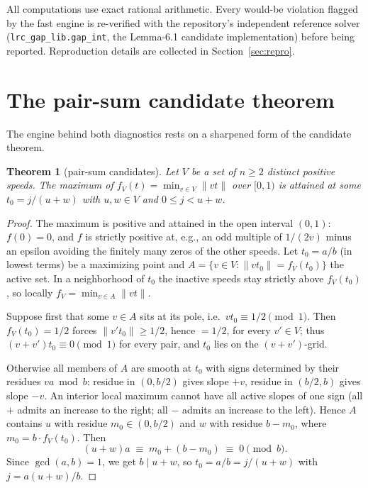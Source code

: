 \documentclass[11pt,a4paper]{article}
\theoremstyle{plain}
\newtheorem{theorem}{Theorem}[section]
\theoremstyle{definition}
\theoremstyle{remark}
\newcommand{\norm}[1]{\lVert #1 \rVert}
\begin{document}
All computations use exact rational arithmetic. Every would-be violation flagged by the
fast engine is re-verified with the repository's independent reference solver
(\texttt{lrc\_gap\_lib.gap\_int}, the Lemma-6.1 candidate implementation) before being
reported. Reproduction details are collected in Section~\ref{sec:repro}.

\section{The pair-sum candidate theorem}\label{sec:machinery}

The engine behind both diagnostics rests on a sharpened form of the candidate theorem.

\begin{theorem}[pair-sum candidates]\label{thm:pairsum}
Let $V$ be a set of $n \ge 2$ distinct positive speeds. The maximum of
$f_V(t) = \min_{v \in V} \norm{v t}$ over $[0,1)$ is attained at some $t_0 = j/(u+w)$
with $u, w \in V$ and $0 \le j < u + w$.
\end{theorem}

\begin{proof}
The maximum is positive and attained in the open interval $(0,1)$: $f(0) = 0$, and $f$
is strictly positive at, e.g., an odd multiple of $1/(2v)$ minus an epsilon avoiding
the finitely many zeros of the other speeds. Let $t_0 = a/b$ (in lowest terms) be a
maximizing point and $A = \{v \in V : \norm{v t_0} = f_V(t_0)\}$ the active set. In a
neighborhood of $t_0$ the inactive speeds stay strictly above $f_V(t_0)$, so locally
$f_V = \min_{v \in A} \norm{v t}$.

Suppose first that some $v \in A$ sits at its pole, i.e.\ $v t_0 \equiv 1/2 \pmod 1$.
Then $f_V(t_0) = 1/2$ forces $\norm{v' t_0} \ge 1/2$, hence $= 1/2$, for every
$v' \in V$; thus $(v + v') t_0 \equiv 0 \pmod 1$ for every pair, and $t_0$ lies on the
$(v+v')$-grid.

Otherwise all members of $A$ are smooth at $t_0$ with signs determined by their residues
$v a \bmod b$: residue in $(0, b/2)$ gives slope $+v$, residue in $(b/2, b)$ gives slope
$-v$. An interior local maximum cannot have all active slopes of one sign (all $+$
admits an increase to the right; all $-$ admits an increase to the left). Hence $A$
contains $u$ with residue $m_0 \in (0, b/2)$ and $w$ with residue $b - m_0$, where
$m_0 = b \cdot f_V(t_0)$. Then
\[
  (u + w) a \;\equiv\; m_0 + (b - m_0) \;\equiv\; 0 \pmod b .
\]
Since $\gcd(a, b) = 1$, we get $b \mid u + w$, so $t_0 = a/b = j/(u+w)$ with
$j = a (u+w)/b$.
\end{proof}
\end{document}
